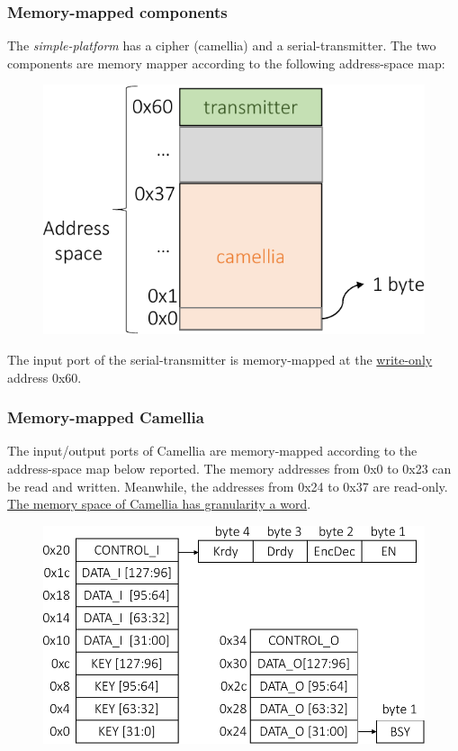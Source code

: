 \documentclass{beamer}
\begin{document}
\begin{frame}

\frametitle{Memory-mapped components}
The \textit{simple-platform} has a cipher (camellia) and a serial-transmitter.
The two components are memory mapper according to the following address-space map:

\begin{figure}
	\centering
	\includegraphics[width=0.5\columnwidth]{figures/address_space-crop.pdf}
\end{figure}

The input port of the serial-transmitter is memory-mapped at the 
\underline{write-only} address 0x60.

\end{frame}

\begin{frame}

\frametitle{Memory-mapped Camellia}
The input/output ports of Camellia are memory-mapped according to the 
address-space map below reported. 
The memory addresses from 0x0 to 0x23 can be read and written. Meanwhile, the addresses
from 0x24 to 0x37 are read-only. \underline{The memory space of Camellia has granularity a word}.

\begin{figure}
	\centering
	\includegraphics[width=0.65\columnwidth]{figures/camellia-crop.pdf}
\end{figure}

\end{frame}
\end{document}
